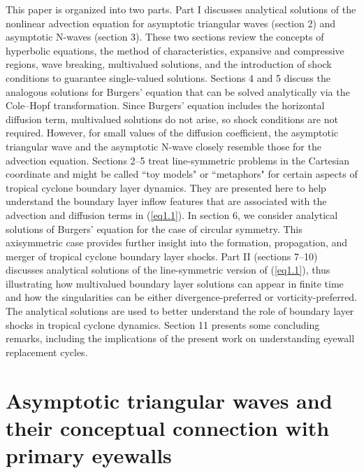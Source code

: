 \documentclass[10pt]{article}
\begin{document}
    This paper is organized into two parts. Part I discusses
analytical solutions of the nonlinear advection equation for asymptotic triangular
waves (section 2) and asymptotic N-waves (section 3).  These two sections review
the concepts of hyperbolic equations,
the method of characteristics, expansive and compressive
regions, wave breaking, multivalued solutions, and the introduction of shock
conditions to guarantee single-valued solutions.  Sections 4 and 5 discuss the
analogous solutions for Burgers' equation that can be solved analytically
via the Cole--Hopf transformation.  Since Burgers' equation includes
the horizontal diffusion term, multivalued solutions do not arise, so shock
conditions are not required. However, for small values of the diffusion
coefficient, the asymptotic triangular wave and the asymptotic N-wave
closely resemble those for the advection equation. Sections 2--5 treat
line-symmetric problems in the Cartesian coordinate and might be called
``toy models" or ``metaphors" for certain aspects of tropical cyclone boundary
layer dynamics. They are presented here to help understand the boundary layer
inflow features that are associated with the advection and diffusion terms
in (\ref{eq1.1}).  In section 6, we
consider analytical solutions of Burgers' equation for the case of
circular symmetry. This axisymmetric case provides further insight into
the formation, propagation, and merger of tropical cyclone boundary layer
shocks. Part II (sections 7--10) discusses analytical solutions of the
line-symmetric version of (\ref{eq1.1}), thus illustrating how multivalued
boundary layer solutions can appear in finite time and how the singularities
can be either divergence-preferred or vorticity-preferred. The analytical solutions
are used to better understand the role of boundary layer shocks in tropical
cyclone dynamics. Section 11 presents some concluding remarks, including the
implications of the present work on understanding eyewall replacement cycles.


\section{Asymptotic triangular waves and their conceptual
         connection with primary eyewalls}       %
\end{document}
